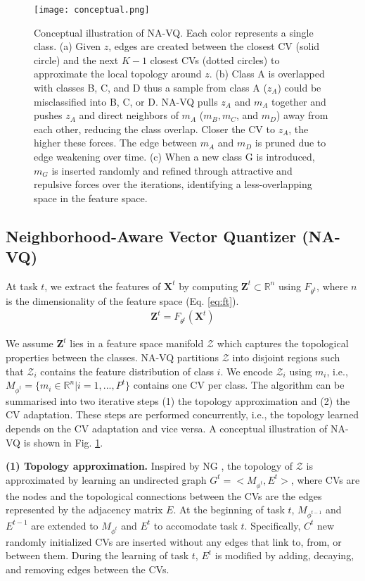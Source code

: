\documentclass[10pt,twocolumn,letterpaper]{article}
\begin{document}
\begin{figure}[t]
\centering
\texttt{[image: 
conceptual.png]}
\caption{Conceptual illustration of NA-VQ. 
Each color represents a single class. 
(a) Given $z$, edges are created between the closest CV (solid circle) and the next $K-1$ closest CVs (dotted circles) to approximate the local topology around $z$. (b) Class A is overlapped with classes B, C, and D thus a sample from class A ($z_A$) could be misclassified into B, C, or D. NA-VQ pulls $z_A$ and $m_A$ together and pushes $z_A$ and direct neighbors of $m_A$ ($m_B,m_C$, and $m_D$) away from each other, reducing the class overlap. Closer the CV to $z_A$, the higher these forces. 
The edge between $m_A$ and $m_D$ is pruned due to edge weakening over time. (c) When a new class G is introduced, $m_G$ is inserted randomly and refined through attractive and repulsive forces over the iterations, identifying a less-overlapping space in the feature space.}
 \label{fig:concept}
\end{figure}


\subsection{Neighborhood-Aware Vector Quantizer (NA-VQ)}\label{sec:navq}



At task $t$, we extract the features of $\mathbf{X}^t$ by computing $\mathbf{Z}^t \subset \mathbb{R}^n $ using $F_{\theta^t}$, where $n$ is the dimensionality of the feature space (Eq. \ref{eq:ft}). 
\begin{align}
\mathbf{Z}^t = F_{\theta^t}(\mathbf{X}^t)
\label{eq:ft}
\end{align}

We assume $\mathbf{Z}^t$ lies in a feature space manifold $\mathcal{Z}$ which captures the topological properties between the classes. NA-VQ partitions $\mathcal{Z}$ into disjoint regions such that $\mathcal{Z}_i$ contains the feature distribution of class $i$. We encode $\mathcal{Z}_i$ using $m_i$, i.e., $M_{\phi^t} = \{m_i \in \mathbb{R}^n| i = 1,..., P^t\}$ contains one CV per class.
 The algorithm can be summarised into two iterative steps (1) the topology approximation and (2) the CV adaptation. 
These steps are performed concurrently, i.e., the topology learned depends on the CV adaptation and vice versa. A conceptual illustration of NA-VQ is shown in Fig. \ref{fig:concept}.

\textbf{(1) Topology approximation.}
Inspired by NG \cite{ThomasMartinetzandKlausSchulten1991ATopologies}, the topology of $\mathcal{Z}$ is approximated by learning an undirected graph $G^t = <M_{\phi^t}, E^t>$, where CVs are the nodes and the topological connections between the CVs are the edges represented by the adjacency matrix $E$. 
At the beginning of task $t$, $M_{\phi^{t-1}}$ and $E^{t-1}$ are extended to $M_{\phi^{t}}$ and $E^{t}$ to accomodate task $t$. Specifically, $C^t$ new randomly initialized CVs are inserted without any edges that link to, from, or between them.
 During the learning of task $t$, $E^{t}$ is modified by adding, decaying, and removing edges between the CVs. 
\end{document}
